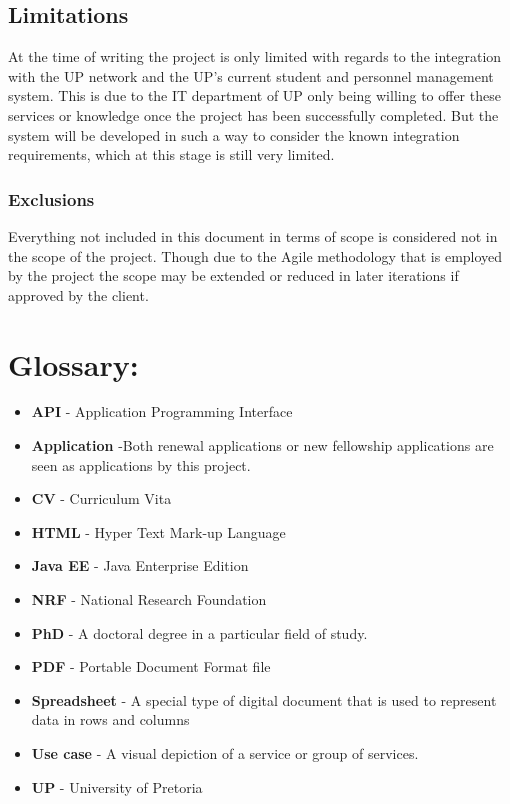 \documentclass[12pt]{article}
\begin{document}
\vspace{0.2in}
\subsection{Limitations}
\vspace{0.2in}
At the time of writing the project is only limited with regards to the integration with the UP network and the UP's current student and personnel management system. This is due to the IT department of UP only being willing to offer these services or knowledge once the project has been successfully completed. But the system will be developed in such a way to consider the known integration requirements, which at this stage is still very limited.

\subsubsection{Exclusions}
\vspace{0.2in}
Everything not included in this document in terms of scope is considered not in the scope of the project. Though due to the Agile methodology that is employed by the project the scope may be extended or reduced in later iterations if approved by the client.
\vspace{0.2in}

\newpage
\section{Glossary:}
\vspace{0.2in}

\begin{itemize}

\item \textbf{API} - Application Programming Interface
\item \textbf{Application} -Both renewal applications or new fellowship applications are seen as applications by this project.
\item \textbf{CV} - Curriculum Vita
\item \textbf{HTML} - Hyper Text Mark-up Language
\item \textbf{Java EE} - Java Enterprise Edition
\item \textbf{NRF} - National Research Foundation
\item \textbf{PhD} - A doctoral degree in a particular field of study.
\item \textbf{PDF} - Portable Document Format file
\item \textbf{Spreadsheet} - A special type of digital document that is used to represent data in rows and columns
\item \textbf{Use case} - A visual depiction of a service or group of services.
\item \textbf{UP} - University of Pretoria
 


\end{itemize}	
\end{document}
